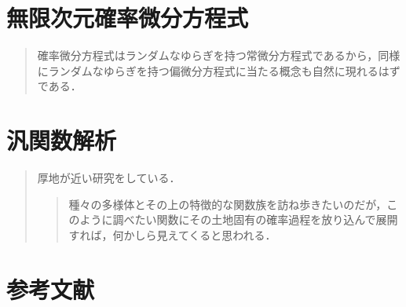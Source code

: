 \documentclass[uplatex,dvipdfmx]{jsreport}
\begin{document}
\chapter{無限次元確率微分方程式}

\begin{quotation}
    確率微分方程式はランダムなゆらぎを持つ常微分方程式であるから，同様にランダムなゆらぎを持つ偏微分方程式に当たる概念も自然に現れるはずである．
\end{quotation}

\chapter{汎関数解析}

\begin{quotation}
    厚地\cite{厚地}が近い研究をしている．
    \begin{quote}
        種々の多様体とその上の特徴的な関数族を訪ね歩きたいのだが，このように調べたい関数にその土地固有の確率過程を放り込んで展開すれば，何かしら見えてくると思われる．
    \end{quote}
\end{quotation}

\chapter{参考文献}
\end{document}
